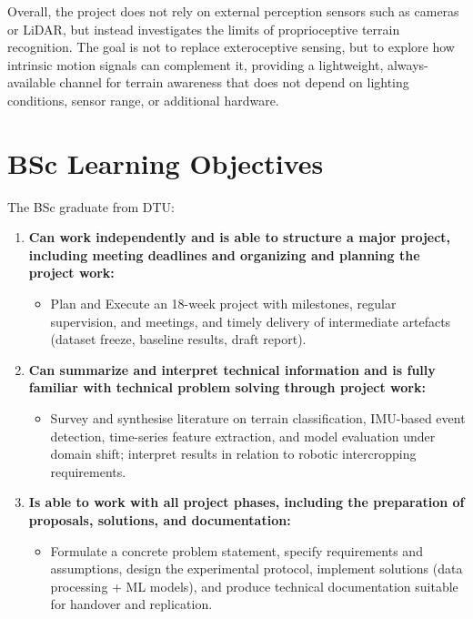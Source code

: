 Overall, the project does not rely on external perception sensors such as cameras or LiDAR, but instead investigates the limits of proprioceptive terrain recognition. The goal is not to replace exteroceptive sensing, but to explore how intrinsic motion signals can complement it, providing a lightweight, always-available channel for terrain awareness that does not depend on lighting conditions, sensor range, or additional hardware.

\newpage
\section{BSc Learning Objectives}

The BSc graduate from DTU: \cite{DTU_BachelorProjectRules2026}
\begin{enumerate}
    \item \textbf{Can work independently and is able to structure a major project, including meeting deadlines and organizing and planning the project work:} 
    \begin{itemize}
        \item Plan and Execute an 18-week project with milestones, regular supervision, and meetings, and timely delivery of intermediate artefacts (dataset freeze, baseline results, draft report).
    \end{itemize}
    

    \item \textbf{Can summarize and interpret technical information and is fully familiar with technical problem solving through project work:} 
    \begin{itemize}
        \item Survey and synthesise literature on terrain classification, IMU-based event detection, time-series feature extraction, and model evaluation under domain shift; interpret results in relation to robotic intercropping requirements.
    \end{itemize}

    \item \textbf{Is able to work with all project phases, including the preparation of proposals, solutions, and documentation:} 
    \begin{itemize}
        \item Formulate a concrete problem statement, specify requirements and assumptions, design the experimental protocol, implement solutions (data processing + ML models), and produce technical documentation suitable for handover and replication.
    \end{itemize}


\end{enumerate}
